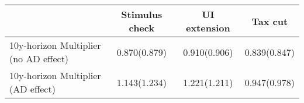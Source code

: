 \begin{tabular}{@{}lccc@{}} 
\toprule 
& Stimulus check    & UI extension    & Tax cut     \\  \midrule 
10y-horizon Multiplier (no AD effect)  &0.870(0.879)  & 0.910(0.906)  & 0.839(0.847)     \\ 
10y-horizon Multiplier (AD effect) &1.143(1.234)  & 1.221(1.211)  & 0.947(0.978)     \\ 
\end{tabular}  
